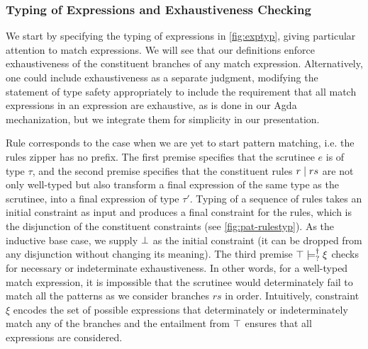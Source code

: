 \subsubsection{Typing of Expressions and Exhaustiveness Checking} \label{sec:exptyp}

We start by specifying the typing of expressions in \autoref{fig:exptyp}, giving particular attention to match expressions. We will see that our definitions enforce exhaustiveness of the constituent branches of any match expression. Alternatively, one could include exhaustiveness as a separate judgment, modifying the statement of type safety appropriately to include the requirement that all match expressions in an expression are exhaustive, as is done in our Agda mechanization, but we integrate them for simplicity in our presentation.

Rule \TMatchZPre corresponds to the case when we are yet to start pattern
matching, i.e. the rules zipper has no prefix. The first premise specifies that the scrutinee $e$ is of type $\tau$,
and the second premise specifies that the constituent rules $r \mid rs$ are not only
well-typed but also transform a final expression of the same type as the
scrutinee, into a final expression of type $\tau'$. 
Typing of a sequence of rules takes an initial constraint as input and produces a final constraint for the rules, 
which is the disjunction of the constituent constraints (see \autoref{fig:pat-rulestyp}). 
As the inductive base case, we supply $\bot$ as the initial constraint (it can be dropped from any disjunction without changing its meaning). 
The 
third premise $\top \models_{?}^{\dag} \xi$ checks for necessary or indeterminate exhaustiveness. 
In other words, for a well-typed match expression,
it is impossible that the scrutinee would determinately fail to match all the patterns as we consider branches $rs$ in order.
Intuitively, constraint $\xi$ encodes the set of possible expressions that determinately or indeterminately match any of the branches and the entailment from $\top$ ensures that all expressions are considered.

